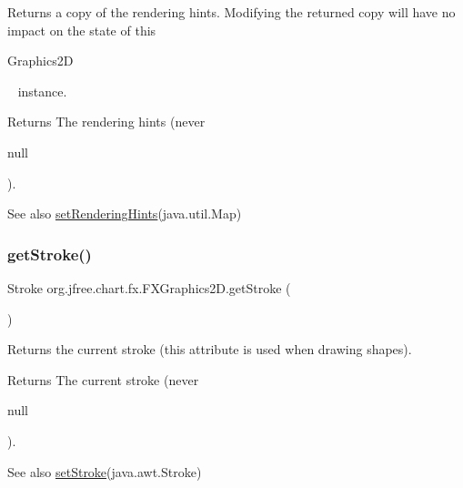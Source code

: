 Returns a copy of the rendering hints. Modifying the returned copy will have no impact on the state of this
\begin{DoxyCode}
Graphics2D 
\end{DoxyCode}
 ~\newline
instance.

\begin{DoxyReturn}{Returns}
The rendering hints (never
\begin{DoxyCode}
null 
\end{DoxyCode}
 ).
\end{DoxyReturn}
\begin{DoxySeeAlso}{See also}
\mbox{\hyperlink{classorg_1_1jfree_1_1chart_1_1fx_1_1_f_x_graphics2_d_aeb0a99279a4b73ea5e5a4eb298c645d3}{set\+Rendering\+Hints}}(java.\+util.\+Map) 
\end{DoxySeeAlso}
\mbox{\label{classorg_1_1jfree_1_1chart_1_1fx_1_1_f_x_graphics2_d_ae202fc349856d0a7fea91cdeb8c4e988}} 
\subsubsection{\texorpdfstring{get\+Stroke()}{getStroke()}}
{\footnotesize\ttfamily Stroke org.\+jfree.\+chart.\+fx.\+F\+X\+Graphics2\+D.\+get\+Stroke (\begin{DoxyParamCaption}{ }\end{DoxyParamCaption})}

Returns the current stroke (this attribute is used when drawing shapes).

\begin{DoxyReturn}{Returns}
The current stroke (never
\begin{DoxyCode}
null 
\end{DoxyCode}
 ).
\end{DoxyReturn}
\begin{DoxySeeAlso}{See also}
\mbox{\hyperlink{classorg_1_1jfree_1_1chart_1_1fx_1_1_f_x_graphics2_d_ad92b82fa8bc1ea26d02986d9b0253506}{set\+Stroke}}(java.\+awt.\+Stroke) 
\end{DoxySeeAlso}
\mbox{\label{classorg_1_1jfree_1_1chart_1_1fx_1_1_f_x_graphics2_d_a8385cc1fdd10671f78bc775a2129575e}} 

